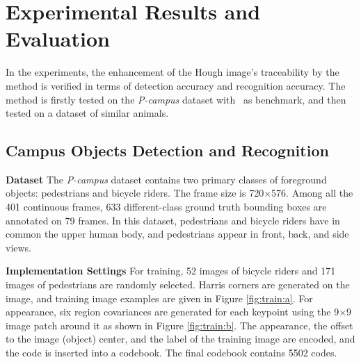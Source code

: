 \documentclass[10pt,twocolumn,letterpaper]{article}
\begin{document}
\section{Experimental Results and Evaluation}
In the experiments, the enhancement of the Hough image's traceability by the method is verified in terms of detection accuracy and recognition accuracy. The method is firstly tested on the \emph{P-campus} dataset with~\cite{ac9} as benchmark, and then tested on a dataset of similar animals.
\subsection{ Campus Objects Detection and Recognition}

\textbf{Dataset} The \emph{P-campus} dataset contains two primary classes of foreground objects: pedestrians and bicycle riders. The frame size is 720$\times$576. Among all the 401 continuous frames, 633 different-class ground truth bounding boxes are annotated on 79 frames. In this dataset, pedestrians and bicycle riders have in common the upper human body, and pedestrians appear in front, back, and side views.

\textbf{Implementation Settings} For training, 52 images of bicycle riders and 171 images of pedestrians are randomly selected. Harris corners are generated on the image, and training image examples are given in Figure \ref{fig:train:a}. For appearance, six region covariances are generated for each keypoint using the 9$\times$9 image patch around it as shown in Figure \ref{fig:train:b}. The appearance, the offset to the image (object) center, and the label of the training image are encoded, and the code is inserted into a codebook. The final codebook contains 5502 codes.
\end{document}
